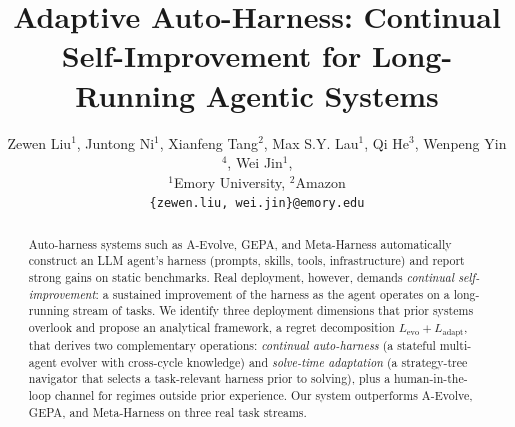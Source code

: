 \documentclass[11pt]{article}
\title{Adaptive Auto-Harness: Continual Self-Improvement for Long-Running Agentic Systems}
\author{
Zewen Liu$^{1}$, Juntong Ni$^{1}$, Xianfeng Tang$^{2}$,
Max S.Y. Lau$^{1}$, Qi He$^{3}$,  Wenpeng Yin$^{4}$, Wei Jin$^{1}$,
\\
$^{1}$Emory University, $^{2}$Amazon \\
\texttt{\{zewen.liu, wei.jin\}@emory.edu}
}
\theoremstyle{plain}
\newcommand{\Levo}{L_{\text{evo}}}
\newcommand{\Ladapt}{L_{\text{adapt}}}
\begin{document}
\maketitle

\begin{abstract}
Auto-harness systems such as A-Evolve, GEPA, and Meta-Harness automatically construct an LLM agent's harness (prompts, skills, tools, infrastructure) and report strong gains on static benchmarks. Real deployment, however, demands \emph{continual self-improvement}: a sustained improvement of the harness as the agent operates on a long-running stream of tasks. We identify three deployment dimensions that prior systems overlook and propose an analytical framework, a regret decomposition $\Levo + \Ladapt$, that derives two complementary operations: \emph{continual auto-harness} (a stateful multi-agent evolver with cross-cycle knowledge) and \emph{solve-time adaptation} (a strategy-tree navigator that selects a task-relevant harness prior to solving), plus a human-in-the-loop channel for regimes outside prior experience. Our system outperforms A-Evolve, GEPA, and Meta-Harness on three real task streams.
\end{abstract}







% 

\appendix

\end{document}

